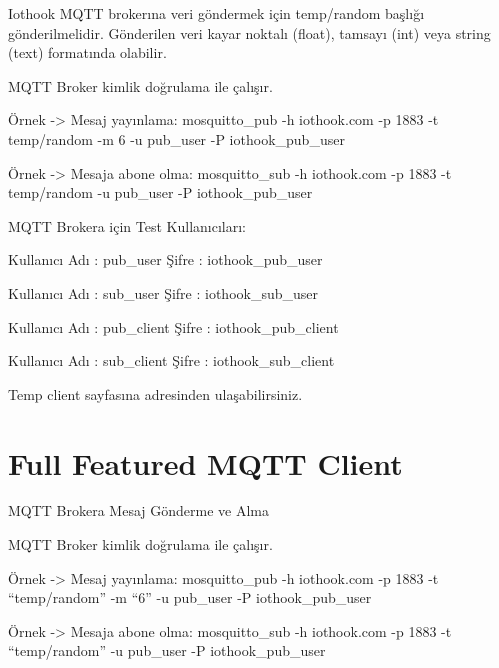 \documentclass[letterpaper,10pt,turkish]{sphinxmanual}
\begin{document}
Iothook MQTT brokerına veri göndermek için \sphinxquotedblleft{}temp/random\sphinxquotedblright{} başlığı gönderilmelidir. Gönderilen veri kayar
noktalı (float), tamsayı (int) veya string (text) formatında olabilir.

MQTT Broker kimlik doğrulama ile çalışır.

Örnek -\textgreater{} Mesaj yayınlama: mosquitto\_pub -h iothook.com -p 1883 -t \sphinxquotedblleft{}temp/random\sphinxquotedblright{} -m \sphinxquotedblleft{}6\sphinxquotedblright{} -u pub\_user -P iothook\_pub\_user

Örnek -\textgreater{} Mesaja abone olma: mosquitto\_sub -h iothook.com -p 1883 -t \sphinxquotedblleft{}temp/random\sphinxquotedblright{} -u pub\_user -P iothook\_pub\_user

MQTT Brokera için Test Kullanıcıları:

Kullanıcı Adı : pub\_user Şifre : iothook\_pub\_user

Kullanıcı Adı : sub\_user Şifre : iothook\_sub\_user

Kullanıcı Adı : pub\_client Şifre : iothook\_pub\_client

Kullanıcı Adı : sub\_client Şifre : iothook\_sub\_client
\begin{figure}[htbp]
\centering
\capstart

\noindent{}
\caption{}\label{\detokenize{mqtt-temp-test-client-publisher-subscriber:id1}}\end{figure}

Temp client sayfasına
adresinden ulaşabilirsiniz.


\section{Full Featured MQTT Client}
\label{\detokenize{full-featured-mqtt-client::doc}}\label{\detokenize{full-featured-mqtt-client:full-featured-mqtt-client}}\label{\detokenize{full-featured-mqtt-client:id1}}
MQTT Brokera Mesaj Gönderme ve Alma

MQTT Broker kimlik doğrulama ile çalışır.

Örnek -\textgreater{} Mesaj yayınlama: mosquitto\_pub -h iothook.com -p 1883 -t “temp/random” -m “6” -u pub\_user -P iothook\_pub\_user

Örnek -\textgreater{} Mesaja abone olma: mosquitto\_sub -h iothook.com -p 1883 -t “temp/random” -u pub\_user -P iothook\_pub\_user
\end{document}
